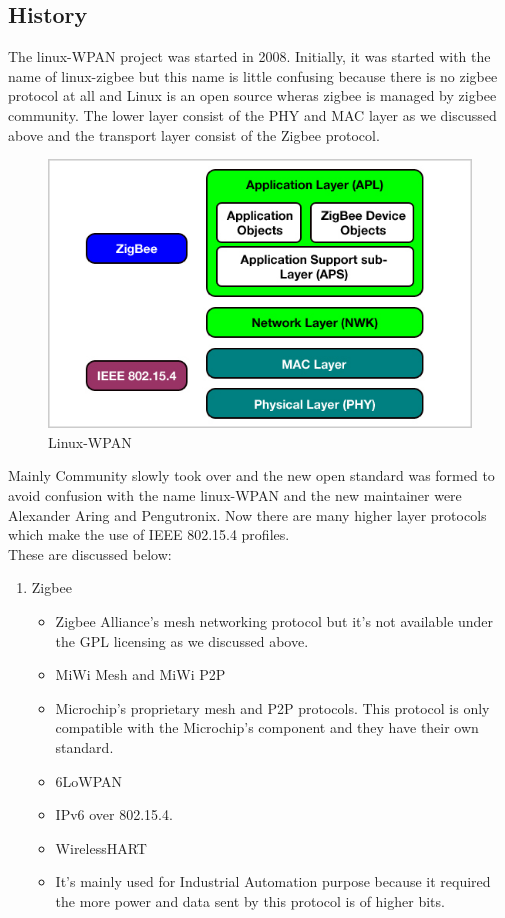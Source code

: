 \subsection{History}
The linux-WPAN project was started in 2008. Initially, it was started with the name of linux-zigbee but this name is little confusing because there is no zigbee protocol at all and  Linux is an open source wheras zigbee is managed by zigbee community. The lower layer consist of the PHY and MAC layer as we discussed above and the transport layer consist of the Zigbee protocol.
\begin{figure}[ht]
	\centering
	\includegraphics[scale=0.8]{images/WPAN.png}
	\caption{Linux-WPAN}
\end{figure}
Mainly Community slowly took over and the new open standard was formed to avoid confusion with the name linux-WPAN and the new maintainer were Alexander Aring and Pengutronix. Now there are many higher layer protocols which make the use of IEEE 802.15.4 profiles.\\
These are discussed below:\\
\begin{enumerate}
	\item{Zigbee}
	\begin{itemize}
		\item Zigbee Alliance's mesh networking protocol but it’s not available under the GPL licensing as we discussed above.
	\item{MiWi Mesh and MiWi P2P}
		\item Microchip's proprietary mesh and P2P protocols. This protocol is only compatible with the Microchip’s component and they have their own standard.
	\item{6LoWPAN}
		\item IPv6 over 802.15.4.
	\item{WirelessHART}
		\item It’s mainly used for Industrial Automation purpose because it required the more power and data sent by this protocol is of higher bits.
	\end{itemize}
\end{enumerate}
